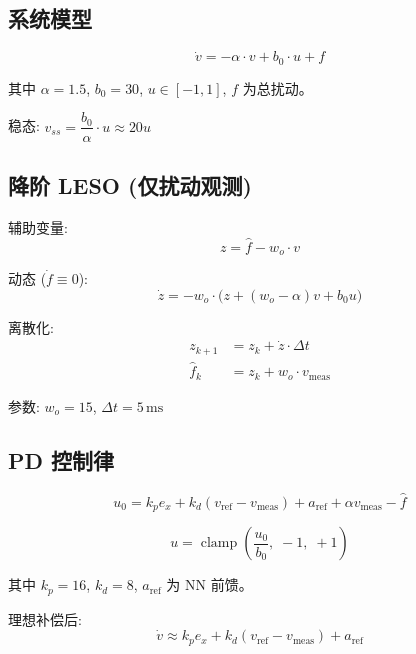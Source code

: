 \documentclass[11pt,a4paper]{article}
\begin{document}
\subsection{系统模型}

\begin{equation}
\boxed{
\dot{v} = -\alpha \cdot v + b_0 \cdot u + f
}
\end{equation}

其中 $\alpha = 1.5$, $b_0 = 30$, $u \in [-1, 1]$, $f$ 为总扰动。

稳态: $v_{ss} = \dfrac{b_0}{\alpha} \cdot u \approx 20u$

\subsection{降阶 LESO (仅扰动观测)}

辅助变量:
\begin{equation}
z = \hat{f} - w_o \cdot v
\end{equation}

动态 ($\dot{f} \equiv 0$):
\begin{equation}
\boxed{
\dot{z} = -w_o \cdot \big(z + (w_o - \alpha)v + b_0 u\big)
}
\end{equation}

离散化:
\begin{align}
z_{k+1} &= z_k + \dot{z} \cdot \Delta t \\
\hat{f}_k &= z_k + w_o \cdot v_{\text{meas}}
\end{align}

参数: $w_o = 15$, $\Delta t = 5\,\text{ms}$

\subsection{PD 控制律}

\begin{equation}
\boxed{
u_0 = k_p e_x + k_d (v_{\text{ref}} - v_{\text{meas}}) + a_{\text{ref}} + \alpha v_{\text{meas}} - \hat{f}
}
\end{equation}

\begin{equation}
u = \operatorname{clamp}\!\left(\frac{u_0}{b_0},\; -1,\; +1\right)
\end{equation}

其中 $k_p = 16$, $k_d = 8$, $a_{\text{ref}}$ 为 NN 前馈。

理想补偿后:
\begin{equation}
\dot{v} \approx k_p e_x + k_d (v_{\text{ref}} - v_{\text{meas}}) + a_{\text{ref}}
\end{equation}
\end{document}
